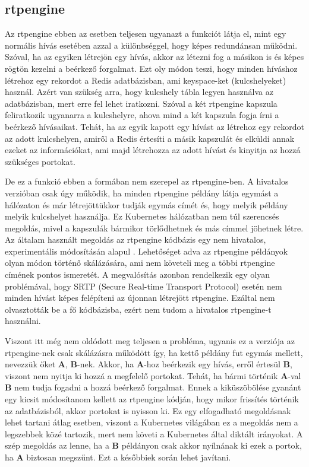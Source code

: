\subsection{rtpengine}\label{sec:rtpengine}

Az rtpengine ebben az esetben teljesen ugyanazt a funkciót látja el, mint egy normális 
hívás esetében azzal a különbséggel, hogy képes redundánsan működni. Szóval, ha az 
egyiken létrejön egy hívás, akkor az létezni fog a másikon is és képes rögtön kezelni a 
beérkező forgalmat. Ezt oly módon teszi, hogy minden híváshoz létrehoz egy rekordot a 
Redis adatbázisban, ami keyspace-ket (kulcshelyeket) használ. Azért van szükség arra, 
hogy kulcshely tábla legyen használva az adatbázisban, mert erre fel lehet iratkozni. 
Szóval a két rtpengine kapszula feliratkozik ugyanarra a kulcshelyre, ahova mind a két 
kapszula fogja írni a beérkező hívásaikat. Tehát, ha az egyik kapott egy hívást az 
létrehoz egy rekordot az adott kulcshelyen, amiről a Redis értesíti a másik kapszulát és 
elküldi annak ezeket az információkat, ami majd létrehozza az adott hívást és kinyitja az 
hozzá szükséges portokat.  

De ez a funkció ebben a formában nem szerepel az rtpengine-ben. A hivatalos verzióban 
csak úgy működik, ha minden rtpengine példány látja egymást a hálózaton és már 
létrejöttükkor tudják egymás címét és, hogy melyik példány melyik kulcshelyet használja. 
Ez Kubernetes hálózatban nem túl szerencsés megoldás, mivel a kapszulák bármikor 
törlődhetnek és más címmel jöhetnek létre. Az általam használt megoldás az
rtpengine kódbázis egy nem hivatalos, experimentális módosításán alapul \cite{oded}. 
Lehetőséget adva az rtpengine példányok olyan módon történő skálázására, ami nem követeli 
meg a többi rtpengine címének pontos ismeretét. A megvalósítás azonban rendelkezik egy 
olyan problémával, hogy SRTP (Secure Real-time Transport Protocol) esetén nem minden 
hívást képes felépíteni az újonnan létrejött rtpengine. Ezáltal nem olvasztották be a fő 
kódbázisba, ezért nem tudom a hivatalos rtpengine-t használni.

Viszont itt még nem oldódott meg teljesen a probléma, ugyanis ez a verziója az 
rtpengine-nek csak skálázásra működött így, ha kettő példány fut egymás mellett, nevezzük 
őket \textbf{A}, \textbf{B}-nek. Akkor, ha \textbf{A}-hoz beérkezik egy hívás, erről 
értesül \textbf{B}, viszont nem nyitja ki hozzá a megfelelő portokat. Tehát, ha bármi 
történik \textbf{A}-val \textbf{B} nem tudja fogadni a hozzá beérkező forgalmat. Ennek a 
kiküszöbölése gyanánt egy kicsit módosítanom kellett az rtpengine kódján, hogy mikor 
frissítés történik az adatbázisból, akkor portokat is nyisson ki. Ez egy elfogadható 
megoldásnak lehet tartani átlag esetben, viszont a Kubernetes világában ez a megoldás nem 
a legszebbek közé tartozik, mert nem követi a Kubernetes által diktált irányokat. A szép 
megoldás az lenne, ha a \textbf{B} példányon csak akkor nyílnának ki ezek a portok, ha 
\textbf{A} biztosan megszűnt. Ezt a későbbiek során lehet javítani.

